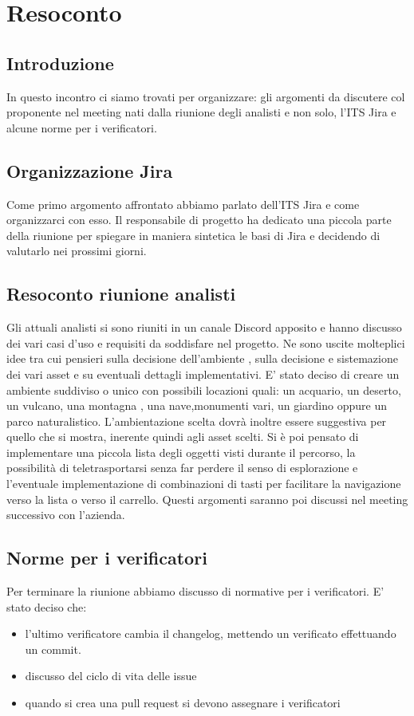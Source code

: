 \section{Resoconto}
\subsection{Introduzione}
In questo incontro ci siamo trovati per organizzare: gli argomenti da discutere col proponente nel meeting nati dalla riunione degli analisti e non solo, l'ITS Jira e alcune norme per i verificatori.   

\subsection{Organizzazione Jira}
Come primo argomento affrontato abbiamo parlato dell'ITS Jira e come organizzarci con esso. Il responsabile di progetto ha dedicato una piccola parte della riunione per spiegare in maniera sintetica le basi di Jira e decidendo di valutarlo nei prossimi giorni.

\subsection{Resoconto riunione analisti}
Gli attuali analisti si sono riuniti in un canale Discord apposito e hanno discusso dei vari casi d'uso e requisiti da soddisfare nel progetto.
Ne sono uscite molteplici idee tra cui pensieri sulla decisione dell'ambiente , sulla decisione e sistemazione dei vari asset e su eventuali dettagli implementativi. E' stato deciso di creare un ambiente suddiviso o unico con possibili locazioni quali: un acquario, un deserto, un vulcano, una montagna , una nave,monumenti vari, un giardino oppure un parco naturalistico. L'ambientazione scelta dovrà inoltre essere suggestiva per quello che si mostra, inerente quindi agli asset scelti.
Si è poi pensato di implementare una piccola lista degli oggetti visti durante il percorso, la possibilità di teletrasportarsi senza far perdere il senso di esplorazione e l'eventuale implementazione di combinazioni di tasti per facilitare la navigazione verso la lista o verso il carrello.  
Questi argomenti saranno poi discussi nel meeting successivo con l'azienda.

\subsection{Norme per i verificatori}
Per terminare la riunione abbiamo discusso di normative per i verificatori. E' stato deciso che:
\begin{itemize}
	\item l'ultimo verificatore cambia il changelog, mettendo un verificato effettuando un commit.
	\item discusso del ciclo di vita delle issue
	\item quando si crea una pull request si devono assegnare i verificatori
\end{itemize} 
 

